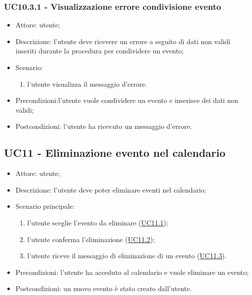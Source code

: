 \subsubsection{UC10.3.1 - Visualizzazione errore condivisione evento} \label{sec: UC10.3.1}
\begin{itemize}
    \item Attore: utente;
    \item Descrizione: l'utente deve ricevere un errore a seguito di dati non validi inseriti durante la procedura per condividere un evento;
    \item Scenario:
        \begin{enumerate}
        \item l'utente visualizza il messaggio d'errore.
        \end{enumerate}
    
    \item Precondizioni:l'utente vuole condividere un evento e inserisce dei dati non validi;
    \item Postcondizioni: l'utente ha ricevuto un messaggio d'errore.
\end{itemize}


\subsection{UC11 - Eliminazione evento nel calendario}
\begin{itemize}
    \item Attore: utente;
    \item Descrizione: l'utente deve poter eliminare eventi nel calendario;
    \item Scenario principale:
        \begin{enumerate}
        \item l'utente sceglie l'evento da eliminare (\hyperref[sec: UC11.1]{UC11.1});
        \item l'utente conferma l'eliminazione (\hyperref[sec: UC11.2]{UC11.2});
        \item l'utente riceve il messaggio di eliminazione di un evento (\hyperref[sec: UC11.3]{UC11.3}).
        \end{enumerate}
    \item Precondizioni: l'utente ha acceduto al calendario e vuole eliminare un evento;
    \item Postcondizioni: un nuovo evento è stato creato dall'utente.
\end{itemize}


